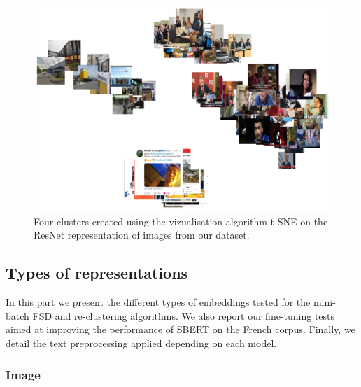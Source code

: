 \begin{figure}[h]
  \centering
  \includegraphics[width=\linewidth]{figures/four_image_clusters.png}
  \caption{Four clusters created using the vizualisation algorithm t-SNE on the ResNet representation of images from our dataset.}
  \label{Fig:t-SNE}
\end{figure}

\subsection{Types of representations \label{SubSec: representations}}
In this part we present the different types of embeddings tested for the mini-batch FSD and re-clustering algorithms. We also report our fine-tuning tests aimed at improving the performance of SBERT on the French corpus. Finally, we detail the text preprocessing applied depending on each model.

\subsubsection{Image}

